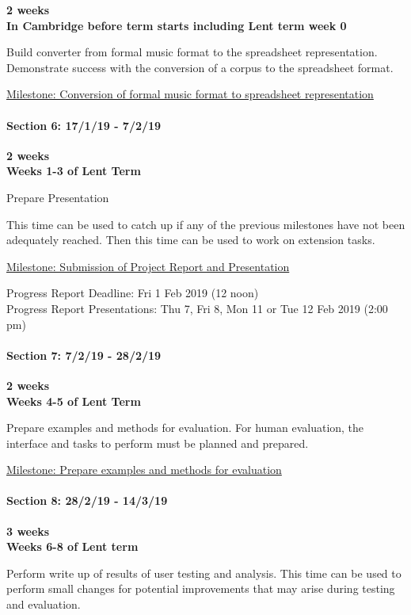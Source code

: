 \documentclass[]{article}
\let\oldparagraph\paragraph
\renewcommand{\paragraph}[1]{\oldparagraph{#1}\mbox{}}
\begin{document}
\textbf{2 weeks}\\\textbf{In Cambridge before
term starts including Lent term week 0}

Build converter from formal music format to the spreadsheet
representation. Demonstrate success with the conversion of a corpus to
the spreadsheet format.

\underline{Milestone: Conversion of formal music format to spreadsheet
representation}

\paragraph{Section 6: 17/1/19 - 7/2/19}\label{header-n105}

\textbf{2 weeks}\\\textbf{Weeks 1-3 of Lent
Term}

Prepare Presentation

This time can be used to catch up if any of the previous milestones have
not been adequately reached. Then this time can be used to work on
extension tasks.

\underline{Milestone: Submission of Project Report and Presentation}

Progress Report Deadline: Fri 1 Feb 2019 (12
noon)\\Progress Report Presentations: Thu 7,
Fri 8, Mon 11 or Tue 12 Feb 2019 (2:00 pm)

\paragraph{Section 7: 7/2/19 - 28/2/19}\label{header-n111}

\textbf{2 weeks}\\\textbf{Weeks 4-5 of Lent
Term}

Prepare examples and methods for evaluation. For human evaluation, the
interface and tasks to perform must be planned and prepared.

\underline{Milestone: Prepare examples and methods for evaluation}

\paragraph{Section 8: 28/2/19 - 14/3/19}\label{header-n115}

\textbf{3 weeks}\\\textbf{Weeks 6-8 of Lent
term}

Perform write up of results of user testing and analysis. This time can
be used to perform small changes for potential improvements that may
arise during testing and evaluation.
\end{document}
